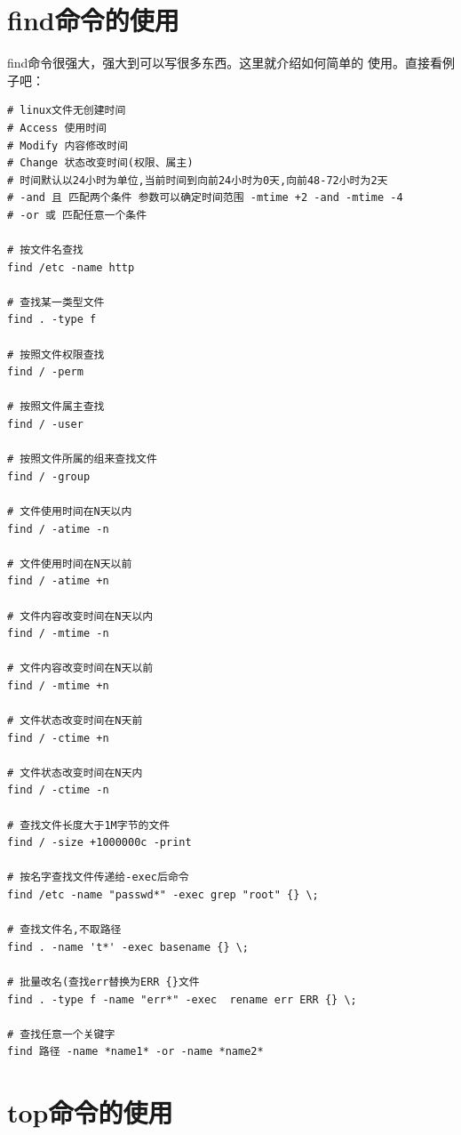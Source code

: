 \section{find命令的使用}

find命令很强大，强大到可以写很多东西。这里就介绍如何简单的
使用。直接看例子吧：

\small{
\begin{verbatim}
# linux文件无创建时间
# Access 使用时间  
# Modify 内容修改时间  
# Change 状态改变时间(权限、属主)
# 时间默认以24小时为单位,当前时间到向前24小时为0天,向前48-72小时为2天
# -and 且 匹配两个条件 参数可以确定时间范围 -mtime +2 -and -mtime -4
# -or 或 匹配任意一个条件

# 按文件名查找
find /etc -name http        

# 查找某一类型文件
find . -type f               

# 按照文件权限查找
find / -perm                 

# 按照文件属主查找
find / -user                 

# 按照文件所属的组来查找文件
find / -group                

# 文件使用时间在N天以内
find / -atime -n             

# 文件使用时间在N天以前
find / -atime +n             

# 文件内容改变时间在N天以内
find / -mtime -n             

# 文件内容改变时间在N天以前
find / -mtime +n             

# 文件状态改变时间在N天前
find / -ctime +n             

# 文件状态改变时间在N天内
find / -ctime -n             

# 查找文件长度大于1M字节的文件
find / -size +1000000c -print 

# 按名字查找文件传递给-exec后命令
find /etc -name "passwd*" -exec grep "root" {} \; 

# 查找文件名,不取路径
find . -name 't*' -exec basename {} \;  

# 批量改名(查找err替换为ERR {}文件
find . -type f -name "err*" -exec  rename err ERR {} \; 

# 查找任意一个关键字
find 路径 -name *name1* -or -name *name2* 
\end{verbatim}
}
\normalsize

\section{top命令的使用}
\label{sec:topCmd}

